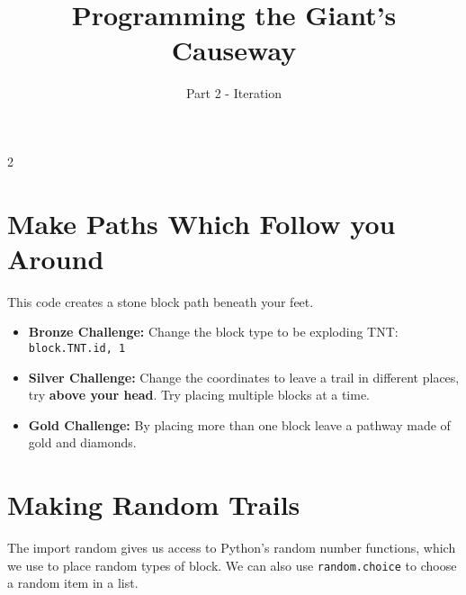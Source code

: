 \documentclass{geocraft-worksheet}
\begin{document}
\title{Programming the Giant's Causeway}
\subtitle{Part 2 - Iteration}

\date{}

\maketitle


\setcounter {section} {2}


\section{Make Paths Which Follow you Around}\vspace{-0.5cm}
\lstset{language=Python}

\noindent%
%
\vspace{0.2cm}
%
%

\noindent This code creates a stone block path beneath your feet.

\begin{itemize}
\item\textbf{Bronze Challenge:} Change the block type to be exploding
  TNT: \lstinline{block.TNT.id, 1}

\item\textbf{Silver Challenge:} Change the coordinates to leave a
  trail in different places, try \textbf{above your head}. Try
  placing multiple blocks at a time.

\item\textbf{Gold Challenge:} By placing more than one block leave a
  pathway made of gold and diamonds.

\end{itemize}

\section{Making Random Trails}\vspace{-0.5cm}


\noindent%
%
\vspace{0.1cm}
%
%

\noindent The import random gives us access to Python's random number
functions, which we use to place random types of block. We can also
use \lstinline{random.choice} to choose a random item in a list.
\end{document}
